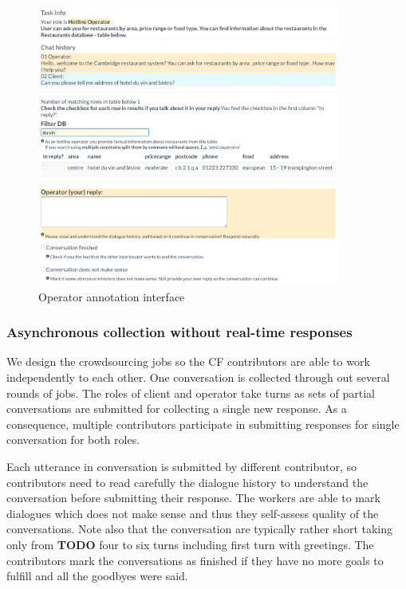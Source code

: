 \documentclass[runningheads,a4paper]{llncs}
\begin{document}
\begin{figure}
\begin{center}
\includegraphics[height=25em]{gui-annotators-system}
\caption{Operator annotation interface}
\end{center}
\vspace{-0.80em}
\label{fig:operator}
\end{figure}

\subsubsection{Asynchronous collection without real-time responses}
\label{sec:async}
We design the crowdsourcing jobs so the CF contributors are able to work independently to each other.
One conversation is collected through out several rounds of jobs.
The roles of client and operator take turns as sets of partial conversations are submitted for collecting a single new response.
As a consequence, multiple contributors participate in submitting responses for single conversation for both roles.

Each utterance in conversation is submitted by different contributor, so contributors need to read carefully the dialogue history to understand the conversation before submitting their response.
The workers are able to mark dialogues which does not make sense and thus they self-assess quality of the conversations.
Note also that the conversation are typically rather short taking only from {\bf TODO} four to six turns including first turn with greetings.
The contributors mark the conversations as finished if they have no more goals to fulfill and all the goodbyes were said.
\end{document}
